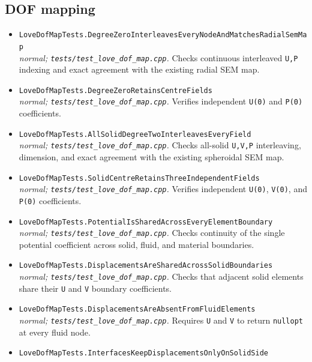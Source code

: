\subsection*{DOF mapping}
\begin{itemize}[leftmargin=1.4em,itemsep=0.35em]
\item {\footnotesize\texttt{LoveDofMapTests.DegreeZeroInterleavesEveryNodeAndMatchesRadialSemMap}}\\
\emph{normal; \texttt{tests/test\_love\_dof\_map.cpp}.} Checks continuous interleaved \texttt{U,P} indexing and exact agreement with the existing radial SEM map.
\item {\footnotesize\texttt{LoveDofMapTests.DegreeZeroRetainsCentreFields}}\\
\emph{normal; \texttt{tests/test\_love\_dof\_map.cpp}.} Verifies independent \texttt{U(0)} and \texttt{P(0)} coefficients.
\item {\footnotesize\texttt{LoveDofMapTests.AllSolidDegreeTwoInterleavesEveryField}}\\
\emph{normal; \texttt{tests/test\_love\_dof\_map.cpp}.} Checks all-solid \texttt{U,V,P} interleaving, dimension, and exact agreement with the existing spheroidal SEM map.
\item {\footnotesize\texttt{LoveDofMapTests.SolidCentreRetainsThreeIndependentFields}}\\
\emph{normal; \texttt{tests/test\_love\_dof\_map.cpp}.} Verifies independent \texttt{U(0)}, \texttt{V(0)}, and \texttt{P(0)} coefficients.
\item {\footnotesize\texttt{LoveDofMapTests.PotentialIsSharedAcrossEveryElementBoundary}}\\
\emph{normal; \texttt{tests/test\_love\_dof\_map.cpp}.} Checks continuity of the single potential coefficient across solid, fluid, and material boundaries.
\item {\footnotesize\texttt{LoveDofMapTests.DisplacementsAreSharedAcrossSolidBoundaries}}\\
\emph{normal; \texttt{tests/test\_love\_dof\_map.cpp}.} Checks that adjacent solid elements share their \texttt{U} and \texttt{V} boundary coefficients.
\item {\footnotesize\texttt{LoveDofMapTests.DisplacementsAreAbsentFromFluidElements}}\\
\emph{normal; \texttt{tests/test\_love\_dof\_map.cpp}.} Requires \texttt{U} and \texttt{V} to return \texttt{nullopt} at every fluid node.
\item {\footnotesize\texttt{LoveDofMapTests.InterfacesKeepDisplacementsOnlyOnSolidSide}}\\

\end{itemize}
